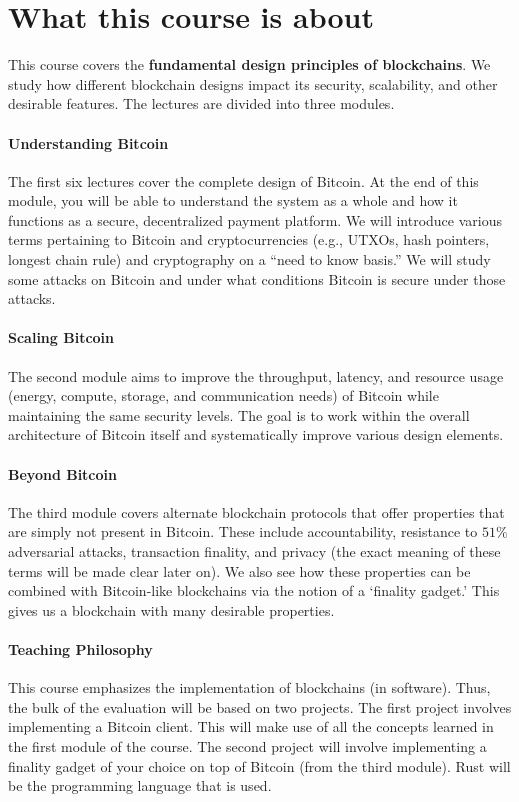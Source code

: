 \documentclass{article}
\begin{document}
\section*{What this course is about}
This course covers the \textbf{fundamental design principles of blockchains}. We study how different blockchain designs impact its security, scalability, and other desirable features. The lectures are divided into three modules.

\paragraph{Understanding Bitcoin} The first six lectures cover the complete design of Bitcoin. At the end of this module, you will be able to understand the system as a whole and how it functions as a secure, decentralized payment platform. We will introduce various terms pertaining to Bitcoin and cryptocurrencies (e.g., UTXOs, hash pointers, longest chain rule) and cryptography on a “need to know basis.” We will study some attacks on Bitcoin and under what conditions Bitcoin is secure under those attacks.

\paragraph{Scaling Bitcoin} The second module aims to improve the throughput, latency, and resource usage (energy, compute, storage, and communication needs) of Bitcoin while maintaining the same security levels. The goal is to work within the overall architecture of Bitcoin itself and systematically improve various design elements. 

\paragraph{Beyond Bitcoin} The third module covers alternate blockchain protocols that offer properties that are simply not present in Bitcoin. These include accountability, resistance to $51\%$ adversarial attacks, transaction finality, and privacy (the exact meaning of these terms will be made clear later on). We also see how these properties can be combined with Bitcoin-like blockchains via the notion of a ‘finality gadget.’ This gives us a blockchain with many desirable properties.


\paragraph{Teaching Philosophy} This course emphasizes the implementation of blockchains (in software). Thus, the bulk of the evaluation will be based on two projects. The first project involves implementing a Bitcoin client. This will make use of all the concepts learned in the first module of the course. The second project will involve implementing a finality gadget of your choice on top of Bitcoin (from the third module). {\sf Rust} will be the programming language that is used.
\end{document}
